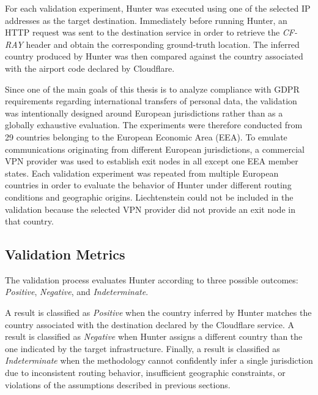 For each validation experiment, Hunter was executed using one of the selected IP addresses as the target destination. Immediately before running Hunter, an HTTP request was sent to the destination service in order to retrieve the \textit{CF-RAY} header and obtain the corresponding ground-truth location. The inferred country produced by Hunter was then compared against the country associated with the airport code declared by Cloudflare.

Since one of the main goals of this thesis is to analyze compliance with GDPR requirements regarding international transfers of personal data, the validation was intentionally designed around European jurisdictions rather than as a globally exhaustive evaluation. The experiments were therefore conducted from 29 countries belonging to the European Economic Area (EEA). To emulate communications originating from different European jurisdictions, a commercial VPN provider was used to establish exit nodes in all except one EEA member states. Each validation experiment was repeated from multiple European countries in order to evaluate the behavior of Hunter under different routing conditions and geographic origins. Liechtenstein could not be included in the validation because the selected VPN provider did not provide an exit node in that country.

  

\subsection{Validation Metrics}

The validation process evaluates Hunter according to three possible outcomes: \textit{Positive}, \textit{Negative}, and \textit{Indeterminate}.

A result is classified as \textit{Positive} when the country inferred by Hunter matches the country associated with the destination declared by the Cloudflare service. A result is classified as \textit{Negative} when Hunter assigns a different country than the one indicated by the target infrastructure. Finally, a result is classified as \textit{Indeterminate} when the methodology cannot confidently infer a single jurisdiction due to inconsistent routing behavior, insufficient geographic constraints, or violations of the assumptions described in previous sections.

